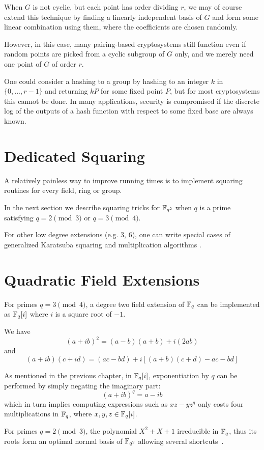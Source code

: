 When $G$ is not cyclic, but each point has order dividing $r$,
we may of course extend this technique by finding a linearly independent
basis of $G$ and form some linear combination using them,
where the coefficients are chosen randomly.

However, in this case,
many pairing-based cryptosystems still function even if random
points are picked from a cyclic subgroup of $G$ only, and we merely need
one point of $G$ of order $r$.

One could consider a hashing to a group by
hashing to an integer $k$ in $\{0,...,r-1\}$ and returning $kP$
for some fixed point $P$, but for most cryptosystems this cannot be done.
In many applications, security is compromised if the discrete log of
the outputs of a hash function with respect to some fixed base are always
known.

\section{Dedicated Squaring}

A relatively painless way to improve running times
is to implement squaring routines for every field, ring or group.

In the next section we describe squaring tricks
for $\mathbb{F}_{q^2}$ when $q$ is a prime satisfying $q = 2 \pmod 3$
or $q = 3 \pmod 4$.

For other low degree extensions (e.g. 3, 6),
one can write special cases of generalized Karatsuba squaring and
multiplication algorithms \cite{wpkaratsuba}.

\section{ \label{sec:quadext} Quadratic Field Extensions}

For primes $q=3\pmod 4$, a degree two field extension of $\mathbb{F}_q$
can be implemented as $\mathbb{F}_q[i]$ where $i$ is a square root of $-1$.

We have
\[ (a + i b)^2 = (a - b)(a + b) + i (2 a b) \]
and
\[ (a + i b)(c + i d) = (ac - bd) + i[(a + b)(c + d) - ac - bd] \]

As mentioned in the previous chapter, in $\mathbb{F}_q[i]$,
exponentiation by $q$ can be performed by simply negating the imaginary part:
\[ (a+ib)^q = a - ib \]
which in turn implies computing expressions such as $x z - y z^q$ only
costs four multiplications in $\mathbb{F}_q$, where $x,y,z \in \mathbb{F}_q[i]$.

For primes $q=2\pmod 3$,
the polynomial $X^2 + X + 1$ irreducible in $\mathbb{F}_q$, thus its roots
form an optimal normal basis of $\mathbb{F}_{q^2}$
allowing several shortcuts~\cite{xtr}.

